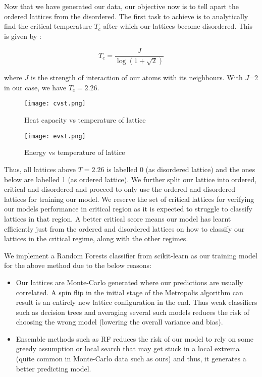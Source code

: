 Now that we have generated our data, our objective now is to tell apart the ordered lattices from the disordered. The first task to achieve is to analytically find the critical temperature $T_c$ after which our lattices become disordered. This is given by \cite{onsager1944crystal}:

\[T_c=\frac{J}{\log(1+\sqrt{2})}\]

where $J$ is the strength of interaction of our atoms with its neighbours. With $J$=2 in our case, we have $T_c=2.26$.

\begin{figure}[h!]
    \centering
    \texttt{[image: cvst.png]}
    \caption{Heat capacity vs temperature of lattice}
\end{figure}

\begin{figure}[h!]
    \centering
    \texttt{[image: evst.png]}
    \caption{Energy vs temperature of lattice}
\end{figure}


Thus, all lattices above $T=2.26$ is labelled 0 (as disordered lattice) and the ones below are labelled 1 (as ordered lattice).
We further split our lattice into ordered, critical and disordered and proceed to only use the ordered and disordered lattices for training our model.
We reserve the set of critical lattices for verifying our models performance in critical region as it is expected to struggle to classify lattices in that region.
A better critical score means our model has learnt efficiently just from the ordered and disordered lattices on how to classify our lattices in the critical regime, along with the other regimes.

We implement a Random Forests classifier from scikit-learn as our training model for the above method due to the below reasons:

\begin{itemize}
    \item Our lattices are Monte-Carlo generated where our predictions are usually correlated. A spin flip in the initial stage of the Metropolis algorithm can result is an entirely new lattice configuration in the end. Thus weak classifiers such as decision trees and averaging several such models reduces the risk of choosing the wrong model (lowering the overall variance and bias).
    \item Ensemble methods such as RF reduces the risk of our model to rely on some greedy assumption or local search that may get stuck in a local extrema (quite common in Monte-Carlo data such as ours) and thus, it generates a better predicting model.
\end{itemize}

